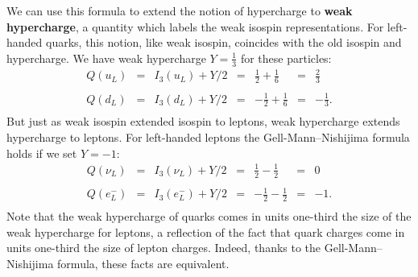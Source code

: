 \documentclass{article}
\newcommand{\half}{\frac{1}{2}} %
\newcommand{\third}{\frac{1}{3}} %
\newcommand{\twothirds}{\frac{2}{3}} %
\begin{document}
We can use this formula to extend the notion of hypercharge to \textbf{weak
hypercharge}, a quantity which labels the weak isospin representations. For
left-handed quarks, this notion, like weak isospin, coincides with the old
isospin and hypercharge.  We have weak hypercharge $Y = \third$ for these
particles:
\[ \begin{array}{ccccrcr}
	Q(u_L) &=& I_3(u_L) + Y/2 & = & \half + \frac{1}{6}  &=& \twothirds \\
                                                                           \\ 
	Q(d_L) &=& I_3(d_L) + Y/2 & = & -\half + \frac{1}{6}& =& -\third .  \\
\end{array}
\]
But just as weak isospin extended isospin to leptons, weak hypercharge extends
hypercharge to leptons. For left-handed leptons the
Gell-Mann--Nishijima formula holds if we set $Y = -1$:
\[ \begin{array}{ccccrcr}
	Q(\nu_L) &=& I_3(\nu_L) + Y/2 & = & \half - \half  &=& 0 \\
                                                                    \\
	Q(e^-_L) &=& I_3(e^-_L) + Y/2 & = & -\half - \half &=& -1 .  \\
\end{array}
\]
Note that the weak hypercharge of quarks comes in units one-third the size of
the weak hypercharge for leptons, a reflection of the fact that quark charges
come in units one-third the size of lepton charges. Indeed, thanks to the
Gell-Mann--Nishijima formula, these facts are equivalent.
\end{document}
